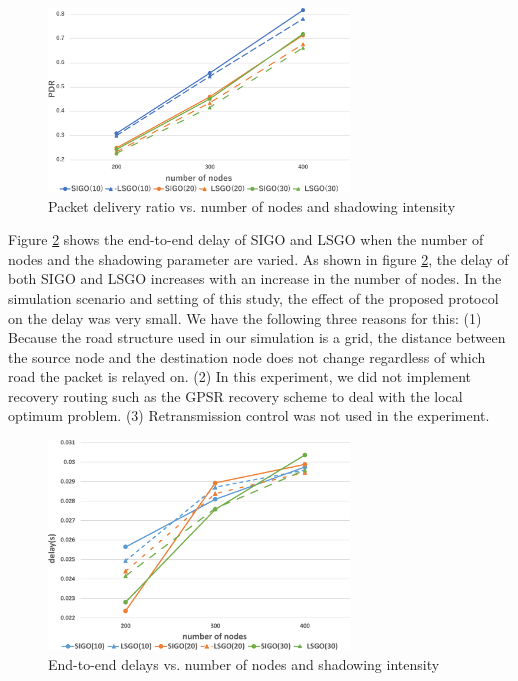 \documentclass[conference]{IEEEtran}
\begin{document}
\begin{figure}[!ht]
\centering
\includegraphics[width=80mm]{figures/PDR.eps}
\caption{Packet delivery ratio vs. number of nodes and shadowing intensity}
\label{fig:PDR}
\end{figure}


Figure \ref{fig:delay} shows the end-to-end delay of SIGO and LSGO when the number of nodes and the shadowing parameter are varied. 
As shown in figure \ref{fig:delay}, the delay of both SIGO and LSGO increases with an increase in the number of nodes. In the simulation scenario and setting of this study, the effect of the proposed protocol on the delay was very small. 
We have the following three reasons for this: 
(1) Because the road structure used in our simulation is a grid, the distance between the source node and the destination node does not change regardless of which road the packet is relayed on.
(2) In this experiment, we did not implement recovery routing such as the GPSR recovery scheme to deal with the local optimum problem. (3) Retransmission control was not used in the experiment.

\begin{figure}[htbp]
\centering\includegraphics[width=80mm]{figures/delay.eps}
\caption{End-to-end delays vs. number of nodes and shadowing intensity}
\label{fig:delay}
\end{figure}
\end{document}
